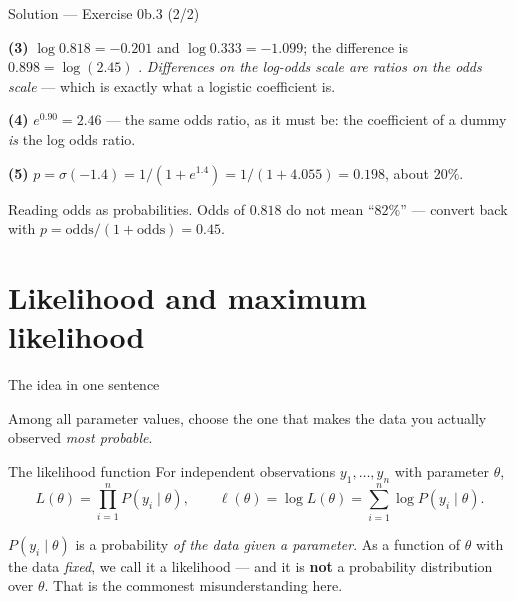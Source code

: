 \documentclass[aspectratio=169,11pt]{beamer}
\begin{document}
\begin{frame}{Solution --- Exercise 0b.3 (2/2)}
  \begin{solutionbox}
    \textbf{(3)} $\log 0.818 = -0.201$ and $\log 0.333 = -1.099$; the
    difference is $0.898 = \log(2.45)$ \checkmark. \emph{Differences on the
    log-odds scale are ratios on the odds scale} --- which is exactly what a
    logistic coefficient is.

    \textbf{(4)} $e^{0.90} = \mathbf{2.46}$ --- the same odds ratio, as it must
    be: the coefficient of a dummy \emph{is} the log odds ratio.

    \textbf{(5)} $p = \sigma(-1.4) = 1/(1 + e^{1.4}) = 1/(1+4.055) =
    \mathbf{0.198}$, about $20\%$.
  \end{solutionbox}
  \begin{mistake}
    Reading odds as probabilities. Odds of $0.818$
    do not mean ``$82\%$'' --- convert back with
    $p = \mathrm{odds}/(1+\mathrm{odds}) = 0.45$.
  \end{mistake}
\end{frame}


\section[Maximum likelihood]{Likelihood and maximum likelihood}

\begin{frame}{The idea in one sentence}\label{frm:mle}
  \begin{takeaway}
    Among all parameter values, choose the one that makes the data you
    actually observed \emph{most probable}.
  \end{takeaway}
  \footnotesize
  \begin{block}{The likelihood function}
    For independent observations $y_1,\dots,y_n$ with parameter $\theta$,
    \[
      L(\theta) = \prod_{i=1}^{n} P(y_i \mid \theta),
      \qquad
      \ell(\theta) = \log L(\theta) = \sum_{i=1}^{n} \log P(y_i \mid \theta) .
    \]
  \end{block}
  \begin{readme}
    $P(y_i \mid \theta)$ is a probability \emph{of the data given a parameter}.
    As a function of $\theta$ with the data \emph{fixed}, we call it a
    likelihood --- and it is \textbf{not} a probability distribution over
    $\theta$. That is the commonest misunderstanding here.
  \end{readme}
\end{frame}
\end{document}
